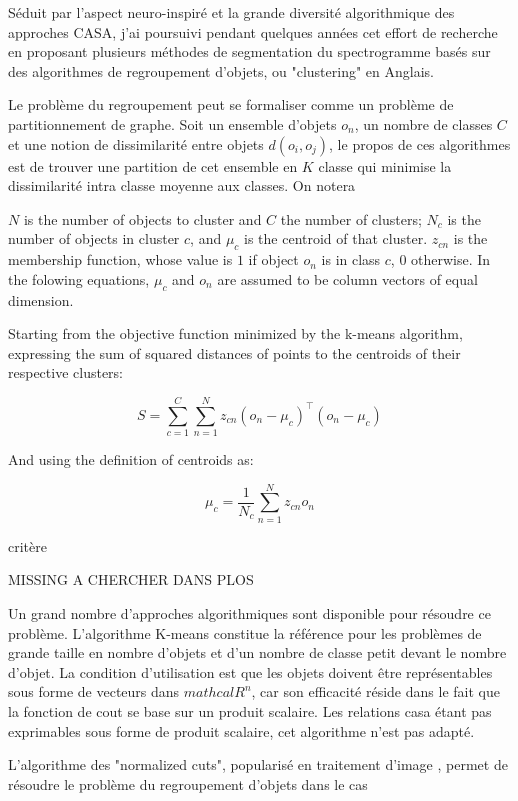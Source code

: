 Séduit par l'aspect neuro-inspiré et la grande diversité algorithmique des approches CASA, j'ai  poursuivi pendant quelques années cet effort de recherche en proposant plusieurs méthodes de segmentation du spectrogramme basés sur des algorithmes de regroupement d'objets, ou "clustering" en Anglais.

Le problème du regroupement peut se formaliser comme un problème de partitionnement de graphe. Soit un ensemble d'objets $o_n$, un nombre de classes $C$ et une notion de dissimilarité entre objets $d(o_i, o_j)$, le propos de ces algorithmes est de trouver une partition de cet ensemble en $K$ classe qui minimise la dissimilarité intra classe moyenne aux classes. On notera

$N$ is the number of objects to cluster and $C$ the number of clusters; $N_c$ is the number of objects in cluster $c$, and $\mu_c$ is the centroid of that cluster. $z_{cn}$ is the membership function, whose value is $1$ if object $o_n$ is in class $c$, $0$ otherwise. In the folowing equations, $\mu_c$ and $o_n$ are assumed to be column vectors of equal dimension.

Starting from the objective function minimized by the k-means algorithm, expressing the sum of squared distances of points to the centroids of their respective clusters:

\[
S = \sum_{c=1}^{C} \sum_{n=1}^{N} z_{cn} \left(o_n-\mu_c\right)^\top\left(o_n-\mu_c\right) \label{eq:S}
\]

And using the definition of centroids as:

\[
\mu_c = \frac{1}{N_c}\sum_{n=1}^{N}z_{cn}o_n
\]


critère

MISSING A CHERCHER DANS PLOS

Un grand nombre d'approches algorithmiques sont disponible pour résoudre ce problème. L'algorithme K-means constitue la référence pour les problèmes de grande taille en nombre d'objets et d'un nombre de classe petit devant le nombre d'objet. La condition d'utilisation est que les objets doivent être représentables sous forme de vecteurs dans $mathcal{R}^n$,  car son efficacité réside dans le fait que la fonction de cout se base sur un produit scalaire. Les relations casa étant pas exprimables sous forme de produit scalaire, cet algorithme n'est pas adapté.

L'algorithme des "normalized cuts", popularisé en traitement d'image \cite{shi2000normalized}, permet de résoudre le problème du regroupement d'objets dans le cas

